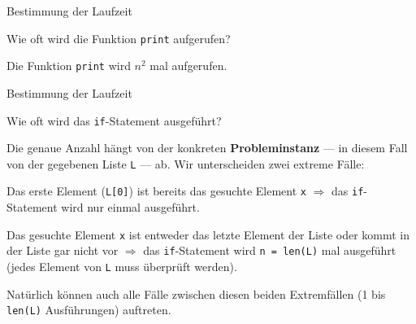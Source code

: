 \begin{frame}{Bestimmung der Laufzeit \faStar\faStar[regular]\faStar[regular]\faStar[regular]\faStar[regular]}
	\begin{myexercise}
	

	Wie oft wird die Funktion \lstinline{print} aufgerufen?
	\end{myexercise}
\end{frame}

\begin{frame}
\begin{myanswer}
	Die Funktion \lstinline{print} wird $n^2$ mal aufgerufen.
\end{myanswer}
\end{frame}

\begin{frame}{Bestimmung der Laufzeit \faStar\faStar\faStar[regular]\faStar[regular]\faStar[regular]}
	\begin{myexercise}
	

	Wie oft wird das \lstinline{if}-Statement ausgeführt? 
	\end{myexercise}
\end{frame}

\begin{frame}
\begin{myanswer}
	Die genaue Anzahl hängt von der konkreten \textbf{Probleminstanz} --- in diesem Fall von der gegebenen Liste \lstinline{L} --- ab. Wir unterscheiden zwei extreme Fälle:
	\pause
	\begin{description}[<+->]
		\item[Günstigster Fall (Best-Case):] Das erste Element (\lstinline{L[0]}) ist bereits das gesuchte Element \lstinline{x} $\Rightarrow$ das \lstinline{if}-Statement wird nur einmal ausgeführt.
		\item[Teuerster Fall (Worst-Case):] Das gesuchte Element \lstinline{x} ist entweder das letzte Element der Liste oder kommt in der Liste gar nicht vor $\Rightarrow$ das \lstinline{if}-Statement wird \lstinline{n = len(L)} mal ausgeführt (jedes Element von \lstinline{L} muss überprüft werden).
	\end{description}
	\pause
	Natürlich können auch alle Fälle zwischen diesen beiden Extremfällen (1 bis \lstinline{len(L)} Ausführungen) auftreten.
\end{myanswer}
\end{frame}

